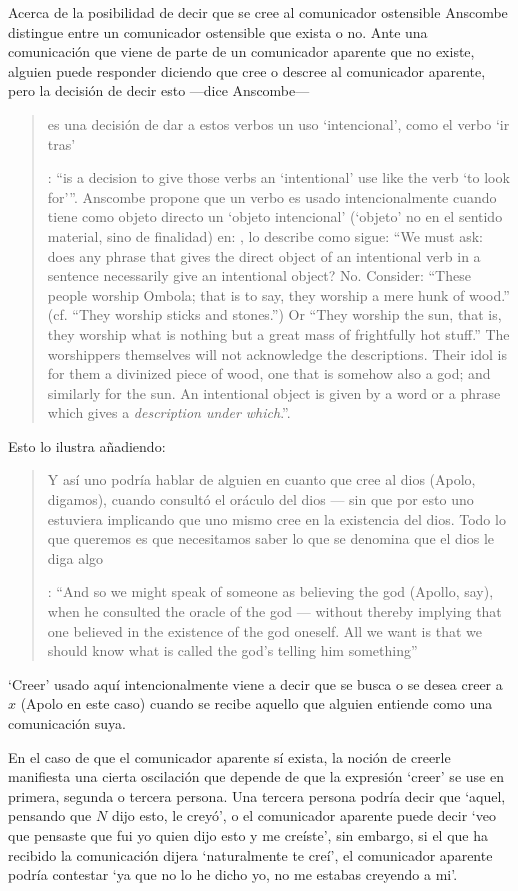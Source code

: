 Acerca de la posibilidad de decir que se cree al comunicador ostensible Anscombe distingue entre un comunicador ostensible que exista o no. Ante una comunicación que viene de parte de un comunicador aparente que no existe, alguien puede responder diciendo que cree o descree al comunicador aparente, pero la decisión de decir esto ---dice Anscombe--- \blockquote[{\cite[7]{anscombe2008faith:tobelieve}}: \enquote{is a decision to give those verbs an `intentional' use like the verb `to look for'}. Anscombe propone que un verbo es usado intencionalmente cuando tiene como objeto directo un `objeto intencional' (`objeto' no en el sentido material, sino de finalidad) en: {\cite[9]{anscombe1981metaphysics:intsens}, lo describe como sigue: \enquote{We must ask: does any phrase that gives the direct object of an intentional verb in a sentence necessarily give an intentional object? No. Consider: ``These people worship Ombola; that is to say, they worship a mere hunk of wood.'' (cf. ``They worship sticks and stones.'') Or ``They worship the sun, that is, they worship what is nothing but a great mass of frightfully hot stuff.'' The worshippers themselves will not acknowledge the descriptions. Their idol is for them a divinized piece of wood, one that is somehow also a god; and similarly for the sun. An intentional object is given by a word or a phrase which gives a \emph{description under which}.}}.]{es una decisión de dar a estos verbos un uso `intencional', como el verbo `ir tras'}. Esto lo ilustra añadiendo: \blockquote[{\cite[7]{anscombe2008faith:tobelieve}}: \enquote{And so we might speak of someone as believing the god (Apollo, say), when he consulted the oracle of the god --- without thereby implying that one believed in the existence of the god oneself. All we want is that we should know what is called the god's telling him something}]{Y así uno podría hablar de alguien en cuanto que cree al dios (Apolo, digamos), cuando consultó el oráculo del dios --- sin que por esto uno estuviera implicando que uno mismo cree en la existencia del dios. Todo lo que queremos es que necesitamos saber lo que se denomina que el dios le diga algo}. `Creer' usado aquí intencionalmente viene a decir que se busca o se desea creer a $x$ (Apolo en este caso) cuando se recibe aquello que alguien entiende como una comunicación suya.

En el caso de que el comunicador aparente sí exista, la noción de creerle manifiesta una cierta oscilación que depende de que la expresión `creer' se use en primera, segunda o tercera persona. Una tercera persona podría decir que \enquote*{aquel, pensando que $N$ dijo esto, le creyó}, o el comunicador aparente puede decir \enquote*{veo que pensaste que fui yo quien dijo esto y me creíste}, sin embargo, si el que ha recibido la comunicación dijera \enquote*{naturalmente te creí}, el comunicador aparente podría contestar \enquote*{ya que no lo he dicho yo, no me estabas creyendo a mi}.

